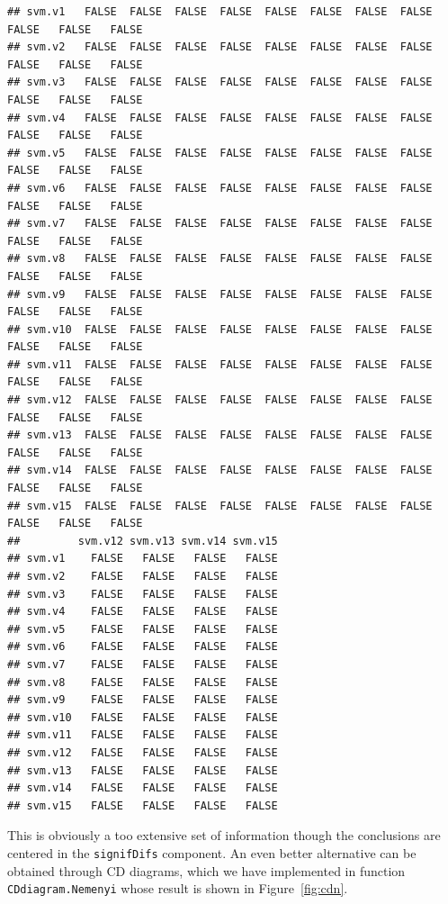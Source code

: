 \documentclass[10pt,a4paper]{article}\usepackage[]{graphicx}\usepackage[]{color}
\makeatletter
\newenvironment{kframe}{%
 \def\at@end@of@kframe{}%
 \ifinner\ifhmode%
  \def\at@end@of@kframe{\end{minipage}}%
  \begin{minipage}{\columnwidth}%
 \fi\fi%
 \def\FrameCommand##1{\hskip\@totalleftmargin \hskip-\fboxsep
 \colorbox{shadecolor}{##1}\hskip-\fboxsep
     \hskip-\linewidth \hskip-\@totalleftmargin \hskip\columnwidth}%
 \MakeFramed {\advance\hsize-\width
   \@totalleftmargin\z@ \linewidth\hsize
   \@setminipage}}%
 {\par\unskip\endMakeFramed%
 \at@end@of@kframe}
\newenvironment{knitrout}{}{} %
\makeatother
\begin{document}
\begin{knitrout}
\begin{kframe}
\begin{verbatim}
## svm.v1   FALSE  FALSE  FALSE  FALSE  FALSE  FALSE  FALSE  FALSE  FALSE   FALSE   FALSE
## svm.v2   FALSE  FALSE  FALSE  FALSE  FALSE  FALSE  FALSE  FALSE  FALSE   FALSE   FALSE
## svm.v3   FALSE  FALSE  FALSE  FALSE  FALSE  FALSE  FALSE  FALSE  FALSE   FALSE   FALSE
## svm.v4   FALSE  FALSE  FALSE  FALSE  FALSE  FALSE  FALSE  FALSE  FALSE   FALSE   FALSE
## svm.v5   FALSE  FALSE  FALSE  FALSE  FALSE  FALSE  FALSE  FALSE  FALSE   FALSE   FALSE
## svm.v6   FALSE  FALSE  FALSE  FALSE  FALSE  FALSE  FALSE  FALSE  FALSE   FALSE   FALSE
## svm.v7   FALSE  FALSE  FALSE  FALSE  FALSE  FALSE  FALSE  FALSE  FALSE   FALSE   FALSE
## svm.v8   FALSE  FALSE  FALSE  FALSE  FALSE  FALSE  FALSE  FALSE  FALSE   FALSE   FALSE
## svm.v9   FALSE  FALSE  FALSE  FALSE  FALSE  FALSE  FALSE  FALSE  FALSE   FALSE   FALSE
## svm.v10  FALSE  FALSE  FALSE  FALSE  FALSE  FALSE  FALSE  FALSE  FALSE   FALSE   FALSE
## svm.v11  FALSE  FALSE  FALSE  FALSE  FALSE  FALSE  FALSE  FALSE  FALSE   FALSE   FALSE
## svm.v12  FALSE  FALSE  FALSE  FALSE  FALSE  FALSE  FALSE  FALSE  FALSE   FALSE   FALSE
## svm.v13  FALSE  FALSE  FALSE  FALSE  FALSE  FALSE  FALSE  FALSE  FALSE   FALSE   FALSE
## svm.v14  FALSE  FALSE  FALSE  FALSE  FALSE  FALSE  FALSE  FALSE  FALSE   FALSE   FALSE
## svm.v15  FALSE  FALSE  FALSE  FALSE  FALSE  FALSE  FALSE  FALSE  FALSE   FALSE   FALSE
##         svm.v12 svm.v13 svm.v14 svm.v15
## svm.v1    FALSE   FALSE   FALSE   FALSE
## svm.v2    FALSE   FALSE   FALSE   FALSE
## svm.v3    FALSE   FALSE   FALSE   FALSE
## svm.v4    FALSE   FALSE   FALSE   FALSE
## svm.v5    FALSE   FALSE   FALSE   FALSE
## svm.v6    FALSE   FALSE   FALSE   FALSE
## svm.v7    FALSE   FALSE   FALSE   FALSE
## svm.v8    FALSE   FALSE   FALSE   FALSE
## svm.v9    FALSE   FALSE   FALSE   FALSE
## svm.v10   FALSE   FALSE   FALSE   FALSE
## svm.v11   FALSE   FALSE   FALSE   FALSE
## svm.v12   FALSE   FALSE   FALSE   FALSE
## svm.v13   FALSE   FALSE   FALSE   FALSE
## svm.v14   FALSE   FALSE   FALSE   FALSE
## svm.v15   FALSE   FALSE   FALSE   FALSE
\end{verbatim}
\end{kframe}
\end{knitrout}

This is obviously a too extensive set of information though the conclusions are centered in the \texttt{signifDifs} component. An even better alternative can be obtained through CD diagrams, which we have implemented in function \texttt{CDdiagram.Nemenyi} whose result is shown in Figure~\ref{fig:cdn}.
\end{document}
